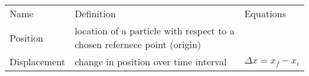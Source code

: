 \documentclass[12pt]{article}
\begin{document}
\begin{table}
	\begin{tabular}{lll}
		Name & Definition & Equations \\
		Position & location of a particle with respect to a chosen refernece point (origin) & \\
		Displacement & change in position over time interval & $ \Delta x=x_{f} - x_{i}$ \\
	\end{tabular}
\end{table}
\end{document}

